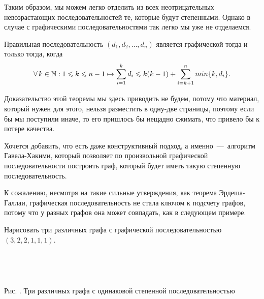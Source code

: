 	Таким образом, мы можем легко отделить из всех неотрицательных невозрастающих последовательностей те, 
	которые будут степенными. Однако в случае с графическими последовательностями так легко мы уже не отделаемся.

\begin{theorem}
	Правильная последовательность $(d_1, d_2, \dots, d_n)$ является графической тогда и только тогда, когда 
	$$\forall \!\ k \in \mathbb{N}: 1 \leqslant k \leqslant n-1 \mapsto \sum_{i=1}^k d_i \leqslant k(k-1) + \sum_{i=k+1}^n min \lbrace k, d_i \rbrace. $$
\end{theorem}

	Доказательство этой теоремы мы здесь приводить не будем, потому что материал, который нужен для этого, нельзя разместить 
	в одну-две страницы, поэтому если бы мы поступили иначе, то его пришлось бы нещадно сжимать, что привело бы к потере качества.

	Хочется добавить, что есть даже конструктивный подход, а именно~---~алгоритм Гавела-Хакими, который позволяет по 
	произвольной графической последовательности построить граф, который будет иметь такую степенную последовательность.

	К сожалению, несмотря на такие сильные утверждения, как теорема Эрдеша-Галлаи, графическая последовательность не стала 
	ключом к подсчету графов, потому что у разных графов она может совпадать, как в следующем примере.
	
\begin{example}
	Нарисовать три различных графа с графической последовательностью $(3, 2, 2, 1, 1, 1)$.
	
\begin{center}
\;\ \;\ \;\ \;\ \;\ \;\ \;\ \;\ \;\ \;\ 
\;\ \;\ \;\ \;\ \;\ \;\ \;\ \;\ \;\ \;\ 
\newline
\newline
	\small Рис. \images. Три различных графа с одинаковой степенной последовательностью
\end{center}
\end{example}

